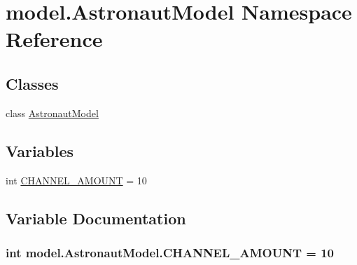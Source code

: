 \hypertarget{namespacemodel_1_1AstronautModel}{}\section{model.\+Astronaut\+Model Namespace Reference}
\label{namespacemodel_1_1AstronautModel}
\subsection*{Classes}
\begin{DoxyCompactItemize}
\item 
class \hyperlink{classmodel_1_1AstronautModel_1_1AstronautModel}{Astronaut\+Model}
\end{DoxyCompactItemize}
\subsection*{Variables}
\begin{DoxyCompactItemize}
\item 
int \hyperlink{namespacemodel_1_1AstronautModel_ae856bd5586331097b334184028678637}{C\+H\+A\+N\+N\+E\+L\+\_\+\+A\+M\+O\+U\+N\+T} = 10
\end{DoxyCompactItemize}


\subsection{Variable Documentation}
\hypertarget{namespacemodel_1_1AstronautModel_ae856bd5586331097b334184028678637}{}
\subsubsection[{C\+H\+A\+N\+N\+E\+L\+\_\+\+A\+M\+O\+U\+N\+T}]{\setlength{\rightskip}{0pt plus 5cm}int model.\+Astronaut\+Model.\+C\+H\+A\+N\+N\+E\+L\+\_\+\+A\+M\+O\+U\+N\+T = 10}\label{namespacemodel_1_1AstronautModel_ae856bd5586331097b334184028678637}
